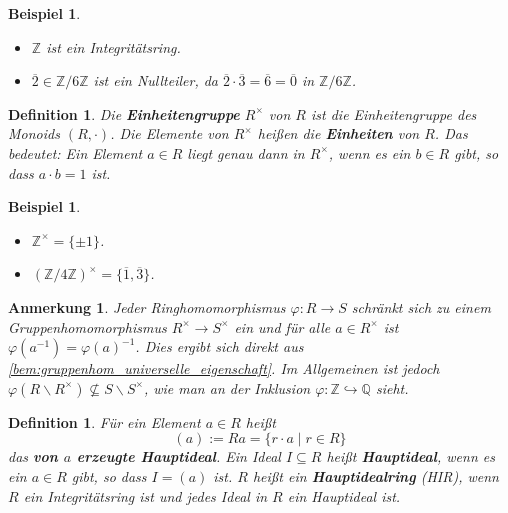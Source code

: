\documentclass[a4paper, twoside, 11pt, ngerman]{report}
\newcommand{\QQ}{\mathds Q}
\newcommand{\ZZ}{\mathds Z}
\renewcommand{\setminus}{\smallsetminus}
\theoremstyle{definistyle}
\newtheorem{defini}[satz]{Definition}
\newtheorem{anm}[satz]{Anmerkung}
\newtheorem{bsp}[satz]{Beispiel}
\theoremstyle{remark}
\newcommand{\defn}[1]{\textit{\bfseries #1}}
\begin{document}
\begin{bsp}\label{bsp:integritätsring}
\begin{itemize}
    \item[(a)] $\ZZ$ ist ein Integritätsring.
    \item[(b)] $\overline{2} \in \ZZ / 6\ZZ$ ist ein Nullteiler, da $\overline{2} \cdot \overline{3} = \overline{6} = \overline{0}$ in $\ZZ / 6\ZZ$.
\end{itemize}
\end{bsp}

\begin{defini}\label{def:einheitengruppe}
Die \defn{Einheitengruppe} $R^{\times}$ von $R$ ist die Einheitengruppe des Monoids $(R, \cdot)$. Die Elemente von $R^{\times}$ heißen die \defn{Einheiten} von $R$. Das bedeutet: Ein Element $a \in R$ liegt genau dann in $R^{\times}$, wenn es ein $b \in R$ gibt, so dass $a \cdot b = 1$ ist.
\end{defini}

\begin{bsp}\label{bsp:einheitengruppe}
\begin{itemize}
    \item[(a)] $\ZZ^{\times} = \{ \pm 1 \}$.
    \item[(b)] $(\ZZ / 4\ZZ)^{\times} = \{ \overline{1}, \overline{3} \}$.
\end{itemize}
\end{bsp}

\begin{anm}\label{anm:einheitenmorphismus}
Jeder Ringhomomorphismus $\varphi\colon R\to S$ schränkt sich zu einem Gruppenhomomorphismus $R^\times\to S^\times$ ein und für alle $a\in R^\times$ ist $\varphi(a^{-1})=\varphi(a)^{-1}$. Dies
ergibt sich direkt aus \ref{bem:gruppenhom_universelle_eigenschaft}. Im Allgemeinen ist jedoch $\varphi(R\setminus R^\times)\not\subseteq S\setminus S^\times$, wie man an der Inklusion $\varphi\colon\ZZ\hookrightarrow\QQ$ sieht.
\end{anm}

\begin{defini}\label{def:hauptideal}
Für ein Element $a \in R$ heißt \[(a) := Ra = \{ r \cdot a \mid r \in R \}\] das \defn{von $a$ erzeugte Hauptideal}. Ein Ideal $I \subseteq R$ heißt \defn{Hauptideal}, wenn es ein $a \in R$ gibt, so dass $I = (a)$ ist. $R$ heißt ein \defn{Hauptidealring} (HIR), wenn $R$ ein Integritätsring ist und jedes Ideal in $R$ ein Hauptideal ist.
\end{defini}
\end{document}
